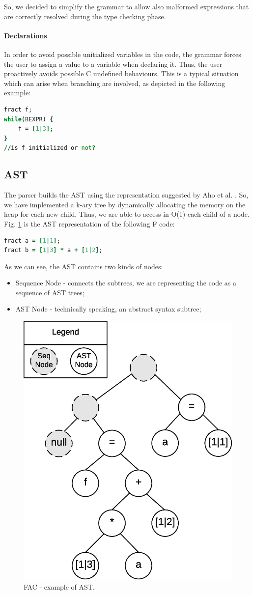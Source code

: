 So, we decided to simplify the grammar to allow also malformed expressions that
are correctly resolved during the type checking phase.


\paragraph{Declarations}

In order to avoid possible unitialized variables in the code, the grammar
forces the user to assign a value to a variable when declaring it.
Thus, the user proactively avoids possible C undefined behaviours.
This is a typical situation which can arise
when branching are involved, as depicted in the following example:
\begin{lstlisting}[language=F, caption={Example of possible uninitialized 
variable.},captionpos=b,label=f-code0, frame = single]
fract f;
while(BEXPR) {
    f = [1|3];
}
//is f initialized or not?
\end{lstlisting}

\subsection{AST}
The parser builds the AST using the representation suggested by Aho et al. 
\cite{dragonbook}. So, we have implemented a k-ary
tree by dynamically allocating the memory on the heap for each new child. Thus, 
we are able to access in O(1) each child of a node.
Fig. \ref{fig:ast} is the AST representation of the following F code:
\begin{lstlisting}[language=F,caption={Example of F code},captionpos=b,
label=f-code1, frame=single]
fract a = [1|1];
fract b = [1|3] * a + [1|2];
\end{lstlisting}
As we can see, the AST contains two kinds of nodes:
\begin{itemize}
	\item Sequence Node - connects the subtrees, we are representing the 
	code as a sequence of AST trees;
	\item AST Node - technically speaking, an abstract syntax subtree;
\end{itemize}
\begin{figure}[H]
  \centering
  \includegraphics[width=.5\columnwidth]{img/eps/ast.eps}
  \caption{FAC - example of AST.}
  \label{fig:ast}
\end{figure}

